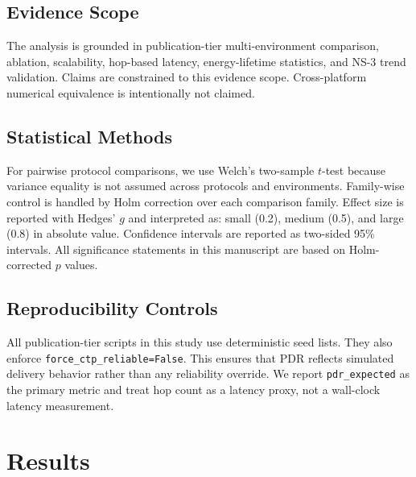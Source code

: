 \documentclass[sensors,article,submit,moreauthors,pdftex]{Definitions/mdpi}
\begin{document}
\subsection{Evidence Scope}
The analysis is grounded in publication-tier multi-environment comparison, ablation, scalability, hop-based latency, energy-lifetime statistics, and NS-3 trend validation. Claims are constrained to this evidence scope. Cross-platform numerical equivalence is intentionally not claimed.

\subsection{Statistical Methods}
For pairwise protocol comparisons, we use Welch's two-sample $t$-test because variance equality is not assumed across protocols and environments. Family-wise control is handled by Holm correction over each comparison family. Effect size is reported with Hedges' $g$ and interpreted as: small (0.2), medium (0.5), and large (0.8) in absolute value. Confidence intervals are reported as two-sided 95\% intervals. All significance statements in this manuscript are based on Holm-corrected $p$ values.

\subsection{Reproducibility Controls}
All publication-tier scripts in this study use deterministic seed lists. They also enforce \texttt{force\_ctp\_reliable=False}. This ensures that PDR reflects simulated delivery behavior rather than any reliability override. We report \texttt{pdr\_expected} as the primary metric and treat hop count as a latency proxy, not a wall-clock latency measurement.

\section{Results}
\end{document}
